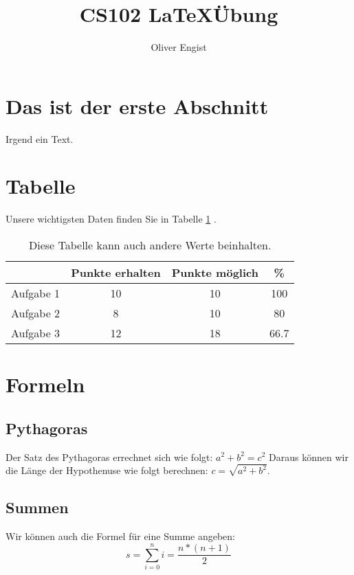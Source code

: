 \documentclass[10pt]{article}
\title{CS102 \LaTeX \thinspace \"Ubung}
\author{Oliver Engist}
\begin{document}
\maketitle
\section{Das ist der erste Abschnitt}
Irgend ein Text.
\section{Tabelle}
Unsere wichtigsten Daten finden Sie in  Tabelle \ref{table:Tabelle 1} .
\begin{table}[H]
\centering
\begin{tabular}{c|c|c|c}
& Punkte erhalten & Punkte möglich & \% \\
\hline
Aufgabe 1 & 10 & 10 & 100\\
Aufgabe 2 & 8 & 10 & 80\\
Aufgabe 3 & 12 & 18 & 66.7\\

\end{tabular}
\caption{Diese Tabelle kann auch andere Werte beinhalten.}
\label{table:Tabelle 1}
\end{table}
\section{Formeln}
\subsection{Pythagoras}
Der Satz des Pythagoras errechnet sich wie folgt: $a^2+b^2=c^2$ Daraus können wir die Länge der Hypothenuse wie folgt berechnen: $c=\sqrt{a^2+b^2}$.
\subsection{Summen}
Wir können auch die Formel für eine Summe angeben: \begin{equation}
s=\sum_{i=0}^n i = \frac{n*(n+1)}{2}
\end{equation}
\end{document}
